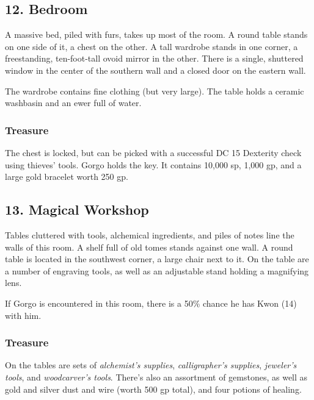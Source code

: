 \documentclass[10pt,a4paper,twoside,bg=print,twocolumn,openany,nodeprecatedcode]{dndbook}
\begin{document}
\subsection{12. Bedroom}
\begin{DndReadAloud}{}
A massive bed, piled with furs, takes up most of the room. A round table stands on one side of it, a chest on the other. A tall wardrobe stands in one corner, a freestanding, ten-foot-tall ovoid mirror in the other. There is a single, shuttered window in the center of the southern wall and a closed door on the eastern wall.

\end{DndReadAloud}

The wardrobe contains fine clothing (but very large). The table holds a ceramic washbasin and an ewer full of water.

\subsubsection{Treasure}
The chest is locked, but can be picked with a successful DC 15 Dexterity check using thieves' tools. Gorgo holds the key. It contains 10,000 sp, 1,000 gp, and a large gold bracelet worth 250 gp.

\subsection{13. Magical Workshop}
\begin{DndReadAloud}{}
Tables cluttered with tools, alchemical ingredients, and piles of notes line the walls of this room. A shelf full of old tomes stands against one wall. A round table is located in the southwest corner, a large chair next to it. On the table are a number of engraving tools, as well as an adjustable stand holding a magnifying lens.

\end{DndReadAloud}

If Gorgo is encountered in this room, there is a 50\% chance he has Kwon (14) with him.

\subsubsection{Treasure}
On the tables are sets of \textit{alchemist's supplies}, \textit{calligrapher's supplies}, \textit{jeweler's tools}, and \textit{woodcarver's tools}. There's also an assortment of gemstones, as well as gold and silver dust and wire (worth 500 gp total), and four potions of healing.
\end{document}
